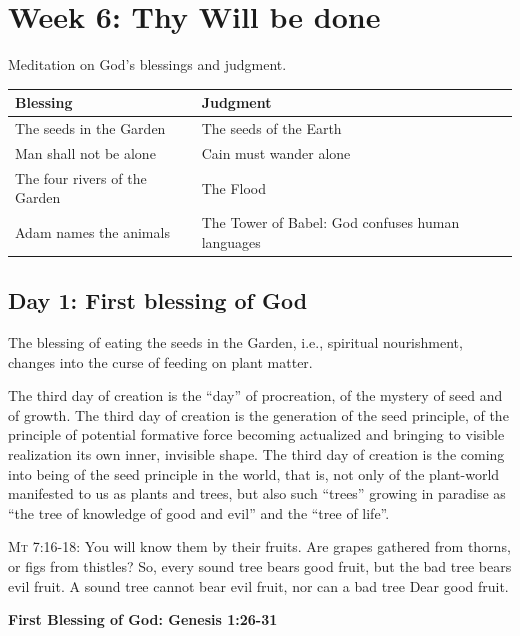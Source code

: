 \chapter{Week 6: Thy Will be done}

Meditation on God's blessings and judgment.

\begin{tabular}{ll}\toprule
\textbf{Blessing} &
\textbf{Judgment}\\\midrule
The seeds in the Garden &
The seeds of the Earth\\
Man shall not be alone &
Cain must wander alone\\
The four rivers of the Garden &
The Flood\\
Adam names the animals &
The Tower of Babel: God confuses human languages\\\bottomrule
\end{tabular}

\section{Day 1: First blessing of God}

The blessing of eating the seeds in the Garden, i.e., spiritual nourishment, changes into the curse of feeding on plant matter.

\begin{quotex}
The third day of creation is the ``day'' of procreation, of the mystery of seed and of growth. The third day of creation is the generation of the seed principle, of the principle of potential formative force becoming actualized and bringing to visible realization its own inner, invisible shape. The third day of creation is the coming into being of the seed principle in the world, that is, not only of the plant-world manifested to us as plants and trees, but also such ``trees'' growing in paradise as ``the tree of knowledge of good and evil'' and the ``tree of life''. 

\end{quotex}

\textsc{Mt 7:16-18:} You will know them by their fruits. Are grapes gathered from thorns, or figs from thistles? So, every sound tree bears good fruit, but the bad tree bears evil fruit. A sound tree cannot bear evil fruit, nor can a bad tree Dear good fruit.

\textbf{First Blessing of God: Genesis 1:26-31}

